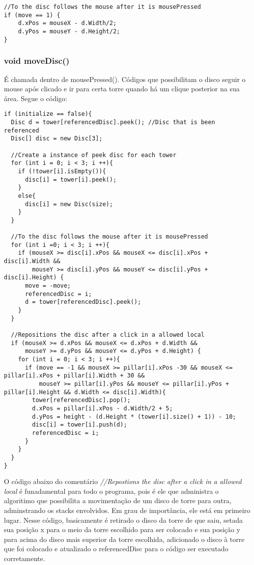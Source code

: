 \documentclass[
	12pt,				%
	oneside,			%
	a4paper,			%
	english,			%
	brazil,				%
	]{abntex2}
\begin{document}
{\begin{itshape}
\begin{verbatim}
//To the disc follows the mouse after it is mousePressed
if (move == 1) {
    d.xPos = mouseX - d.Width/2;
    d.yPos = mouseY - d.Height/2;
} 
\end{verbatim}
\end{itshape}
\subsubsection{void moveDisc()}
É chamada dentro de mousePressed(). Códigos que possibilitam o disco seguir o mouse após clicado e ir para certa torre quando há um clique posterior na sua área. Segue o código: 

\begin{itshape}
\begin{verbatim}
if (initialize == false){
  Disc d = tower[referencedDisc].peek(); //Disc that is been referenced
  Disc[] disc = new Disc[3];

  //Create a instance of peek disc for each tower
  for (int i = 0; i < 3; i ++){
    if (!tower[i].isEmpty()){
      disc[i] = tower[i].peek();
    }
    else{
      disc[i] = new Disc(size);
    }
  }

  //To the disc follows the mouse after it is mousePressed
  for (int i =0; i < 3; i ++){
    if (mouseX >= disc[i].xPos && mouseX <= disc[i].xPos + disc[i].Width &&
        mouseY >= disc[i].yPos && mouseY <= disc[i].yPos + disc[i].Height) {
      move = -move;
      referencedDisc = i;
      d = tower[referencedDisc].peek(); 
    }
  }

  //Repositions the disc after a click in a allowed local
  if (mouseX >= d.xPos && mouseX <= d.xPos + d.Width &&
      mouseY >= d.yPos && mouseY <= d.yPos + d.Height) {
    for (int i = 0; i < 3; i ++){
      if (move == -1 && mouseX >= pillar[i].xPos -30 && mouseX <= pillar[i].xPos + pillar[i].Width + 30 &&
          mouseY >= pillar[i].yPos && mouseY <= pillar[i].yPos + pillar[i].Height && d.Width <= disc[i].Width){
        tower[referencedDisc].pop();
        d.xPos = pillar[i].xPos - d.Width/2 + 5;
        d.yPos = height - (d.Height * (tower[i].size() + 1)) - 10;  
        disc[i] = tower[i].push(d); 
        referencedDisc = i;
      }
    }
  }
}
\end{verbatim}
\end{itshape}

O código abaixo do comentário \textit{//Repostions the disc after a click in a allowed local} é funadamental para todo o programa, pois é ele que administra o algoritimo que possibilita a movimentação de um disco de torre para outra, adminstrando os stacks envolvidos. Em grau de importância, ele está em primeiro lugar. Nesse código, basicamente é retirado o disco da torre de que saiu, setada sua posição x para o meio da torre escolhido para ser colocado e sua posição y para acima do disco mais superior da torre escolhida, adicionado o disco à torre que foi colocado e atualizado o referencedDisc para o código ser executado corretamente.

}
\end{document}
